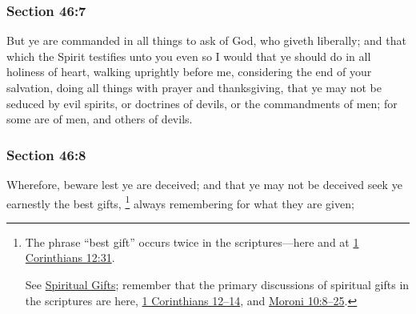 	\subsubsection{Section 46:7} %
		\label{DC46-7}

		But ye are commanded in all things to ask of God, who giveth liberally; and that which the Spirit testifies unto you even so I would that ye should do in all holiness of heart, walking uprightly before me, considering the end of your salvation, doing all things with prayer and thanksgiving, that ye may not be seduced by evil spirits, or doctrines of devils, or the commandments of men; for some are of men, and others of devils.


	\subsubsection{Section 46:8} %
		\label{DC46-8}

		Wherefore, beware lest ye are deceived; and that ye may not be deceived seek ye earnestly the best gifts,%
			\footnote{%
				The phrase ``best gift'' occurs twice in the scriptures---here and at \hyperref[1CORINTHIANS-12-31]{1 Corinthians 12:31}.
				
				See \hyperref[SPIRITUALGIFTS]{Spiritual Gifts}; remember that the primary discussions of spiritual gifts in the scriptures are here, \hyperref[1CORINTHIANS-12]{1 Corinthians 12--14}, and \hyperref[MORONI-10-8]{Moroni 10:8--25}.
				}
		always remembering for what they are given;


